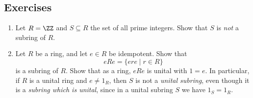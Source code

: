 \documentclass{article}
\begin{document}
\subsection*{Exercises}

\begin{enumerate}
\item Let $R = \ZZ$ and $S \subseteq R$ the set of all prime integers. Show that $S$ is \emph{not} a subring of $R$.

\item Let $R$ be a ring, and let $e \in R$ be idempotent. Show that \[ eRe = \{ ere \mid r \in R \} \] is a subring of $R$. Show that as a ring, $eRe$ is unital with $1 = e$. In particular, if $R$ is a unital ring and $e \neq 1_R$, then $S$ is not a \emph{unital subring}, even though it is a \emph{subring which is unital}, since in a unital subring $S$ we have $1_S = 1_R$.
\end{enumerate}
\end{document}
